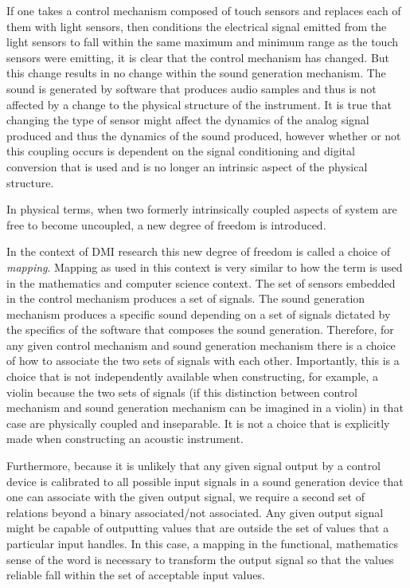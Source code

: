 If one takes a control mechanism composed of touch sensors and replaces each of them with light sensors, then conditions the electrical signal emitted from the light sensors to fall within the same maximum and minimum range as the touch sensors were emitting, it is clear that the control mechanism has changed. But this change results in no change within the sound generation mechanism. The sound is generated by software that produces audio samples and thus is not affected by a change to the physical structure of the instrument. It is true that changing the type of sensor might affect the dynamics of the analog signal produced and thus the dynamics of the sound produced, however whether or not this coupling occurs is dependent on the signal conditioning and digital conversion that is used and is no longer an intrinsic aspect of the physical structure.

In physical terms, when two formerly intrinsically coupled aspects of system are free to become uncoupled, a new degree of freedom is introduced.

In the context of DMI research this new degree of freedom is called a choice of \emph{mapping}. Mapping as used in this context is very similar to how the term is used in the mathematics and computer science context. The set of sensors embedded in the control mechanism produces a set of signals. The sound generation mechanism produces a specific sound depending on a set of signals dictated by the specifics of the software that composes the sound generation. Therefore, for any given control mechanism and sound generation mechanism there is a choice of how to associate the two sets of signals with each other. Importantly, this is a choice that is not independently available when constructing, for example, a violin because the two sets of signals (if this distinction between control mechanism and sound generation mechanism can be imagined in a violin) in that case are physically coupled and inseparable. It is not a choice that is explicitly made when constructing an acoustic instrument.

Furthermore, because it is unlikely that any given signal output by a control device is calibrated to all possible input signals in a sound generation device that one can associate with the given output signal, we require a second set of relations beyond a binary associated/not associated. Any given output signal might be capable of outputting values that are outside the set of values that a particular input handles. In this case, a mapping in the functional, mathematics sense of the word is necessary to transform the output signal so that the values reliable fall within the set of acceptable input values.

